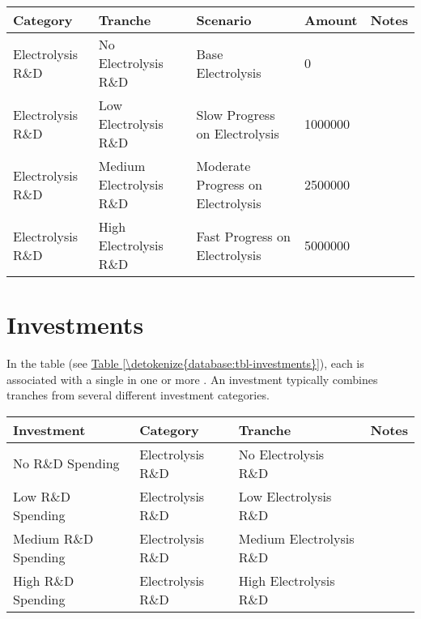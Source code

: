 \documentclass[letterpaper,10pt,english]{sphinxmanual}
\begin{document}
\begin{savenotes}\sphinxattablestart
\centering
{}
\sphinxthecaptionisattop
{}\label{\detokenize{database:table-6}}\label{\detokenize{database:tbl-tranches}}
\sphinxaftertopcaption
\begin{tabulary}{\linewidth}[t]{|T|T|T|T|T|}
\hline
\sphinxstyletheadfamily 
Category
&\sphinxstyletheadfamily 
Tranche
&\sphinxstyletheadfamily 
Scenario
&\sphinxstyletheadfamily 
Amount
&\sphinxstyletheadfamily 
Notes
\\
\hline
Electrolysis R\&D
&
No Electrolysis R\&D
&
Base Electrolysis
&
0
&\\
\hline
Electrolysis R\&D
&
Low Electrolysis R\&D
&
Slow Progress on Electrolysis
&
1000000
&\\
\hline
Electrolysis R\&D
&
Medium Electrolysis R\&D
&
Moderate Progress on Electrolysis
&
2500000
&\\
\hline
Electrolysis R\&D
&
High Electrolysis R\&D
&
Fast Progress on Electrolysis
&
5000000
&\\
\hline
\end{tabulary}
\par
\sphinxattableend\end{savenotes}


\section{Investments}
\label{\detokenize{database:investments}}
In the  table (see \hyperref[\detokenize{database:tbl-investments}]{Table \ref{\detokenize{database:tbl-investments}}}), each 
is associated with a single  in one or more . An
investment typically combines tranches from several different investment
categories.


\begin{savenotes}\sphinxattablestart
\centering
{}
\sphinxthecaptionisattop
{}\label{\detokenize{database:table-7}}\label{\detokenize{database:tbl-investments}}
\sphinxaftertopcaption
\begin{tabulary}{\linewidth}[t]{|T|T|T|T|}
\hline
\sphinxstyletheadfamily 
Investment
&\sphinxstyletheadfamily 
Category
&\sphinxstyletheadfamily 
Tranche
&\sphinxstyletheadfamily 
Notes
\\
\hline
No R\&D Spending
&
Electrolysis R\&D
&
No Electrolysis R\&D
&\\
\hline
Low R\&D Spending
&
Electrolysis R\&D
&
Low Electrolysis R\&D
&\\
\hline
Medium R\&D Spending
&
Electrolysis R\&D
&
Medium Electrolysis R\&D
&\\
\hline
High R\&D Spending
&
Electrolysis R\&D
&
High Electrolysis R\&D
&\\
\hline
\end{tabulary}
\par
\sphinxattableend\end{savenotes}
\end{document}
